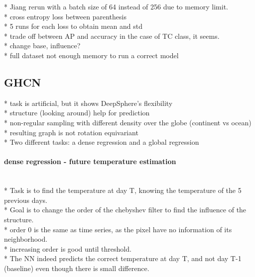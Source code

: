 \documentclass{article} %
\begin{document}
* Jiang rerun with a batch size of 64 instead of 256 due to memory limit.\\
* cross entropy loss between parenthesis\\
* 5 runs for each loss to obtain mean and std\\

* trade off between AP and accuracy in the case of TC class, it seems.\\
* change base, influence?\\

* full dataset not enough memory to run a correct model


\subsection{GHCN}

* task is artificial, but it shows DeepSphere's flexibility\\
* structure (looking around) help for prediction\\

* non-regular sampling with different density over the globe (continent vs ocean)\\
* resulting graph is not rotation equivariant\\
* Two different tasks: a dense regression and a global regression\\

\paragraph*{dense regression - future temperature estimation}~\\
* Task is to find the temperature at day T, knowing the temperature of the 5 previous days.\\
* Goal is to change the order of the chebyshev filter to find the influence of the structure.\\
* order 0 is the same as time series, as the pixel have no information of its neighborhood.\\
* increasing order is good until threshold.\\
* The NN indeed predicts the correct temperature at day T, and not day T-1 (baseline) even though there is small difference.\\
\end{document}
